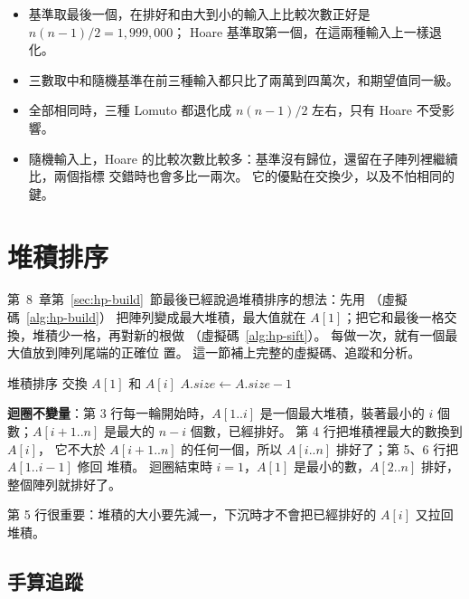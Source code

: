\begin{itemize}
\item 基準取最後一個，在排好和由大到小的輸入上比較次數正好是 $n(n-1)/2 = 1{,}999{,}000$；
Hoare 基準取第一個，在這兩種輸入上一樣退化。
\item 三數取中和隨機基準在前三種輸入都只比了兩萬到四萬次，和期望值同一級。
\item 全部相同時，三種 Lomuto 都退化成 $n(n-1)/2$ 左右，只有 Hoare 不受影響。
\item 隨機輸入上，Hoare 的比較次數比較多：基準沒有歸位，還留在子陣列裡繼續比，兩個指標
交錯時也會多比一兩次。 它的優點在交換少，以及不怕相同的鍵。
\end{itemize}

\section{堆積排序}
\label{sec:so-heap}

第~8~章第~\ref{sec:hp-build}~節最後已經說過堆積排序的想法：先用 （虛擬碼~\ref{alg:hp-build}）
把陣列變成最大堆積，最大值就在 $A[1]$；把它和最後一格交換，堆積少一格，再對新的根做
（虛擬碼~\ref{alg:hp-sift}）。 每做一次，就有一個最大值放到陣列尾端的正確位
置。 這一節補上完整的虛擬碼、追蹤和分析。

\begin{pseudo}[label=alg:so-heapsort]{堆積排序}
    \State {} 
        \State 交換 $A[1]$ 和 $A[i]$ 
        \State $A.\mathit{size} \gets A.\mathit{size} - 1$
        \State {}
    \EndFor
\EndProcedure
\end{pseudo}

\textbf{迴圈不變量}：第 3 行每一輪開始時，$A[1..i]$ 是一個最大堆積，裝著最小的 $i$ 個
數；$A[i+1..n]$ 是最大的 $n - i$ 個數，已經排好。 第 4 行把堆積裡最大的數換到 $A[i]$，
它不大於 $A[i+1..n]$ 的任何一個，所以 $A[i..n]$ 排好了；第 5、6 行把 $A[1..i-1]$ 修回
堆積。 迴圈結束時 $i = 1$，$A[1]$ 是最小的數，$A[2..n]$ 排好，整個陣列就排好了。

第 5 行很重要：堆積的大小要先減一，下沉時才不會把已經排好的 $A[i]$ 又拉回堆積。

\subsection{手算追蹤}

